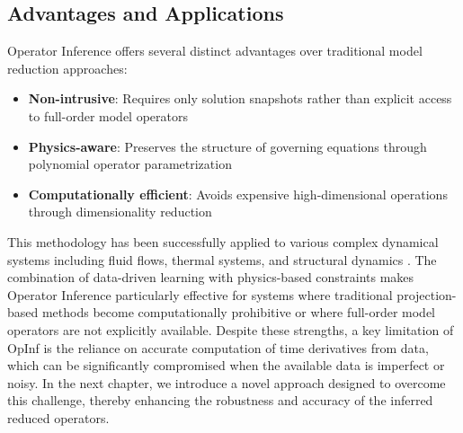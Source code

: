 \subsection*{Advantages and Applications}
Operator Inference offers several distinct advantages over traditional model reduction approaches:
\begin{itemize}
    \item \textbf{Non-intrusive}: Requires only solution snapshots rather than explicit access to full-order model operators
    \item \textbf{Physics-aware}: Preserves the structure of governing equations through polynomial operator parametrization
    \item \textbf{Computationally efficient}: Avoids expensive high-dimensional operations through dimensionality reduction
\end{itemize}

This methodology has been successfully applied to various complex dynamical systems including fluid flows, thermal systems, and structural dynamics \cite{ghattas2021learning,rowley2017model}. The combination of data-driven learning with physics-based constraints makes Operator Inference particularly effective for systems where traditional projection-based methods become computationally prohibitive or where full-order model operators are not explicitly available. Despite these strengths, a key limitation of OpInf is the reliance on accurate computation of time derivatives from data, which can be significantly compromised when the available data is imperfect or noisy. In the next chapter, we introduce a novel approach designed to overcome this challenge, thereby enhancing the robustness and accuracy of the inferred reduced operators.


